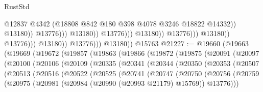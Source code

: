 \begin{lexlean}{RustStd}
\begin{coremodule}
{\begin{coremodule}
{{{{{{{{{{{{{{{{{{{{{{{{{{{{{{{                                                            @12837
                                                            @4342
                                                            (@18808
                                                              @842
                                                              @180
                                                              @398
                                                              @4078
                                                              @3246
                                                              @18822
                                                              @14332))
                                                          @13180))
                                                      @13776)))
                                                @13180))
                                            @13776)))
                                      @13180))
                                  @13776)))
                            @13180))
                        @13776)))
                  @13180))
              @13776)))
        @13180))
    @15763
@21227 := @19660
    (@19663
      (@19669
        (@19672
          (@19857
            (@19863
              (@19866
                (@19872
                  (@19875
                    (@20091
                      (@20097
                        (@20100
                          (@20106
                            (@20109
                              (@20335
                                (@20341
                                  (@20344
                                    (@20350
                                      (@20353
                                        (@20507
                                          (@20513
                                            (@20516
                                              (@20522
                                                (@20525
                                                  (@20741
                                                    (@20747
                                                      (@20750
                                                        (@20756
                                                          (@20759
                                                            (@20975
                                                              (@20981
                                                                (@20984
                                                                  (@20990 (@20993 @21179) @15769))
                                                                @13776)))
}}}}}}}}}}}}}}}}}}}}}}}}}}}}}}}
\end{coremodule}}
\end{coremodule}
\end{lexlean}
